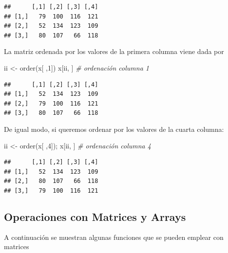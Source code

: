 \documentclass[
]{book}
\newenvironment{Shaded}{\begin{snugshade}}{\end{snugshade}}
\newcommand{\CommentTok}[1]{\textcolor[rgb]{0.56,0.35,0.01}{\textit{#1}}}
\newcommand{\DecValTok}[1]{\textcolor[rgb]{0.00,0.00,0.81}{#1}}
\newcommand{\FunctionTok}[1]{\textcolor[rgb]{0.00,0.00,0.00}{#1}}
\newcommand{\NormalTok}[1]{#1}
\newcommand{\OtherTok}[1]{\textcolor[rgb]{0.56,0.35,0.01}{#1}}
\theoremstyle{break}
\theoremstyle{nonumberplain}
\begin{document}
\begin{verbatim}
##      [,1] [,2] [,3] [,4]
## [1,]   79  100  116  121
## [2,]   52  134  123  109
## [3,]   80  107   66  118
\end{verbatim}

La matriz ordenada por los valores de la primera columna viene dada por

\begin{Shaded}
\begin{Highlighting}[]
\NormalTok{ii }\OtherTok{\textless{}{-}} \FunctionTok{order}\NormalTok{(x[ ,}\DecValTok{1}\NormalTok{])}
\NormalTok{x[ii, ]  }\CommentTok{\# ordenación columna 1}
\end{Highlighting}
\end{Shaded}

\begin{verbatim}
##      [,1] [,2] [,3] [,4]
## [1,]   52  134  123  109
## [2,]   79  100  116  121
## [3,]   80  107   66  118
\end{verbatim}

De igual modo, si queremos ordenar por los valores de la cuarta columna:

\begin{Shaded}
\begin{Highlighting}[]
\NormalTok{ii }\OtherTok{\textless{}{-}} \FunctionTok{order}\NormalTok{(x[ ,}\DecValTok{4}\NormalTok{]); x[ii, ]  }\CommentTok{\# ordenación columna 4}
\end{Highlighting}
\end{Shaded}

\begin{verbatim}
##      [,1] [,2] [,3] [,4]
## [1,]   52  134  123  109
## [2,]   80  107   66  118
## [3,]   79  100  116  121
\end{verbatim}

\hypertarget{operaciones-con-matrices-y-arrays}{%
\subsection{Operaciones con Matrices y Arrays}\label{operaciones-con-matrices-y-arrays}}

A continuación se muestran algunas funciones que se pueden emplear con
matrices
\end{document}
